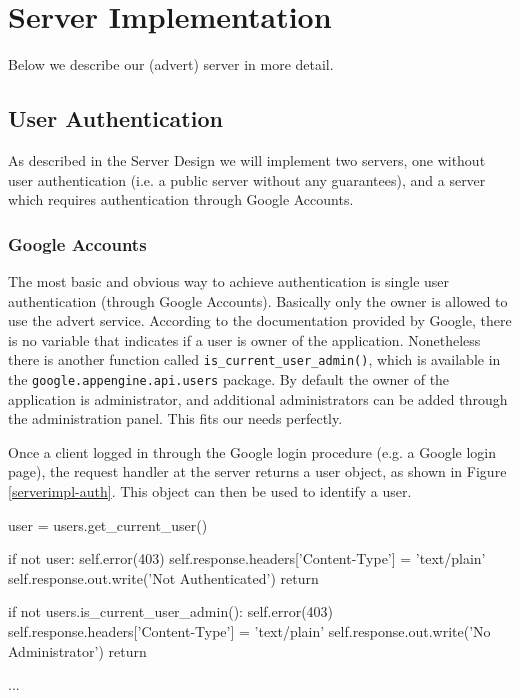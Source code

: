 \section{Server Implementation}
Below we describe our (advert) server in more detail.

\subsection{User Authentication}
As described in the Server Design we will implement two servers, one without user
authentication (i.e. a public server without any guarantees), and a server which
requires authentication through Google Accounts.

\subsubsection{Google Accounts}
The most basic and obvious way to achieve authentication is single user
authentication (through Google Accounts). Basically only the owner is allowed to
use the advert service. According to the documentation provided by Google, there
is no variable that indicates if a user is owner of the application. Nonetheless
there is another function called \texttt{is\_current\_user\_admin()}, which is
available in the \texttt{google.appengine.api.users} package. By default the
owner of the application is administrator, and additional administrators can be
added through the administration panel. This fits our needs perfectly.

Once a client logged in through the Google login procedure (e.g. a Google login
page), the request handler at the server returns a user object, as shown in
Figure \ref{serverimpl-auth}. This object can then be used to identify a
user.

\begin{figure*}[ht] %
\begin{center}
\begin{code}
user   = users.get_current_user()

if not user:
    self.error(403)
    self.response.headers['Content-Type'] = 'text/plain'
    self.response.out.write('Not Authenticated')
    return

if not users.is_current_user_admin():
    self.error(403)
    self.response.headers['Content-Type'] = 'text/plain'
    self.response.out.write('No Administrator')
    return
    
...
\end{code}
\caption{Authenticating a User.\label{serverimpl-auth}}
\end{center}
\end{figure*}

